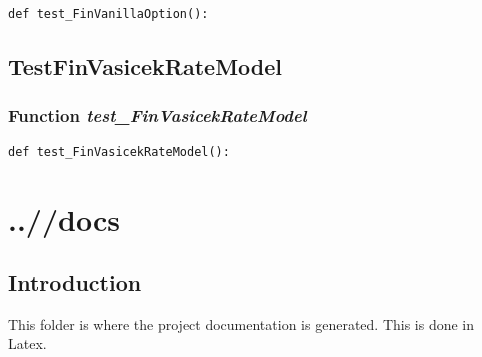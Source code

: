 \documentclass[twoside,11pt]{book}
\begin{document}
\begin{lstlisting}
def test_FinVanillaOption():
\end{lstlisting}


\newpage
\section{TestFinVasicekRateModel}

\subsection{Function {\it test\_FinVasicekRateModel}}


\begin{lstlisting}
def test_FinVasicekRateModel():
\end{lstlisting}


\chapter{..//docs}
\section{Introduction}
This folder is where the project documentation is generated. This is done in Latex.
\end{document}
